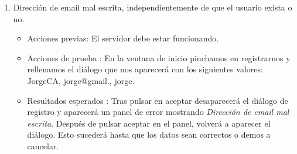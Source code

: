 \begin{enumerate}
\item Dirección de email mal escrita, independientemente de que el usuario exista o no.
	\begin{itemize}
	\item Acciones previas: El servidor debe estar funcionando.
	\item Acciones de prueba : En la ventana de inicio pinchamos en registrarnos y rellenamos el diálogo que nos aparecerá con los siguientes valores: JorgeCA, jorge@gmail., jorge.
	\item Resultados esperados : Tras pulsar en aceptar desaparecerá el diálogo de registro y aparecerá un panel de error mostrando \emph{Dirección de email mal escrita}. Después de pulsar aceptar en el panel, volverá a aparecer el diálogo. Esto sucederá hasta que los datos sean correctos o demos a cancelar.
	\end{itemize}
\end{enumerate}
